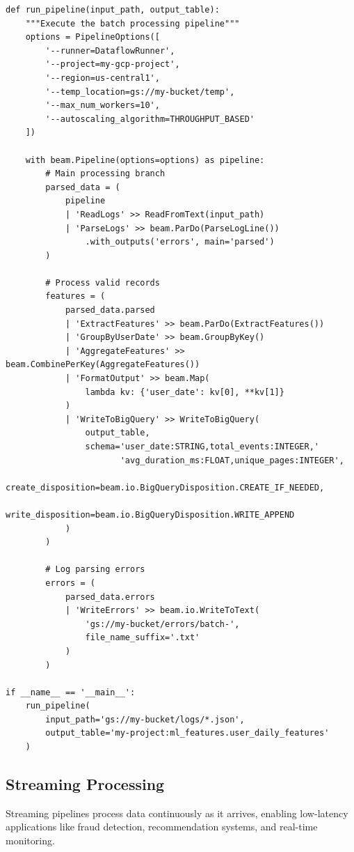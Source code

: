 \begin{lstlisting}[style=python, caption=Apache Beam batch processing pipeline]
def run_pipeline(input_path, output_table):
    """Execute the batch processing pipeline"""
    options = PipelineOptions([
        '--runner=DataflowRunner',
        '--project=my-gcp-project',
        '--region=us-central1',
        '--temp_location=gs://my-bucket/temp',
        '--max_num_workers=10',
        '--autoscaling_algorithm=THROUGHPUT_BASED'
    ])

    with beam.Pipeline(options=options) as pipeline:
        # Main processing branch
        parsed_data = (
            pipeline
            | 'ReadLogs' >> ReadFromText(input_path)
            | 'ParseLogs' >> beam.ParDo(ParseLogLine())
                .with_outputs('errors', main='parsed')
        )

        # Process valid records
        features = (
            parsed_data.parsed
            | 'ExtractFeatures' >> beam.ParDo(ExtractFeatures())
            | 'GroupByUserDate' >> beam.GroupByKey()
            | 'AggregateFeatures' >> beam.CombinePerKey(AggregateFeatures())
            | 'FormatOutput' >> beam.Map(
                lambda kv: {'user_date': kv[0], **kv[1]}
            )
            | 'WriteToBigQuery' >> WriteToBigQuery(
                output_table,
                schema='user_date:STRING,total_events:INTEGER,'
                       'avg_duration_ms:FLOAT,unique_pages:INTEGER',
                create_disposition=beam.io.BigQueryDisposition.CREATE_IF_NEEDED,
                write_disposition=beam.io.BigQueryDisposition.WRITE_APPEND
            )
        )

        # Log parsing errors
        errors = (
            parsed_data.errors
            | 'WriteErrors' >> beam.io.WriteToText(
                'gs://my-bucket/errors/batch-',
                file_name_suffix='.txt'
            )
        )

if __name__ == '__main__':
    run_pipeline(
        input_path='gs://my-bucket/logs/*.json',
        output_table='my-project:ml_features.user_daily_features'
    )
\end{lstlisting}

\subsection{Streaming Processing}

Streaming pipelines process data continuously as it arrives, enabling low-latency applications like fraud detection, recommendation systems, and real-time monitoring.

